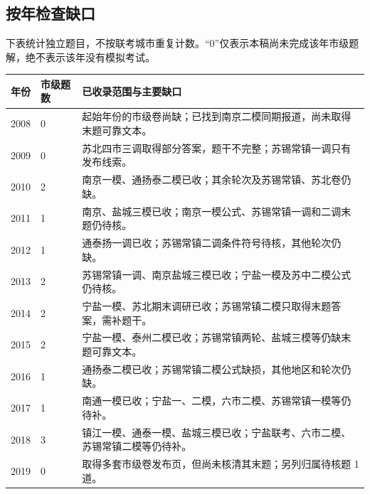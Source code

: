 \documentclass[UTF8]{ctexart}
\begin{document}
\subsection{按年检查缺口}
下表统计独立题目，不按联考城市重复计数。“0”仅表示本稿尚未完成该年市级题解，绝不表示该年没有模拟考试。
\begin{longtable}{p{}p{}p{}}
\textbf{年份}&\textbf{市级题数}&\textbf{已收录范围与主要缺口}\\\hline
2008&0&起始年份的市级卷尚缺；已找到南京二模同期报道，尚未取得末题可靠文本。\\
2009&0&苏北四市三调取得部分答案，题干不完整；苏锡常镇一调只有发布线索。\\
2010&2&南京一模、通扬泰二模已收；其余轮次及苏锡常镇、苏北卷仍缺。\\
2011&1&南京、盐城三模已收；南京一模公式、苏锡常镇一调和二调末题仍待核。\\
2012&1&通泰扬一调已收；苏锡常镇二调条件符号待核，其他轮次仍缺。\\
2013&2&苏锡常镇一调、南京盐城三模已收；宁盐一模及苏中二模公式仍待核。\\
2014&2&宁盐一模、苏北期末调研已收；苏锡常镇二模只取得末题答案，需补题干。\\
2015&2&宁盐一模、泰州二模已收；苏锡常镇两轮、盐城三模等仍缺末题可靠文本。\\
2016&1&通扬泰二模已收；苏锡常镇二模公式缺损，其他地区和轮次仍缺。\\
2017&1&南通一模已收；宁盐一、二模，六市二模、苏锡常镇一模等仍待补。\\
2018&3&镇江一模、通泰一模、盐城三模已收；宁盐联考、六市二模、苏锡常镇二模等仍待补。\\
2019&0&取得多套市级卷发布页，但尚未核清其末题；另列归属待核题 1 道。\\\hline
\end{longtable}
\end{document}
